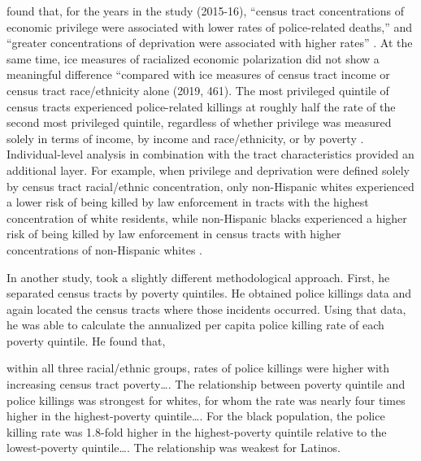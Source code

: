 \documentclass[12pt]{article}
\renewenvironment{quote}
  {\list{}{\leftmargin=\parindent\rightmargin=0pt}%
   \item\relax}
  {\endlist}
\begin{document}
\citeauthor{feldmanPoliceRelatedDeathsNeighborhood2019} found that, for the years in the study (2015-16), “census tract concentrations of economic privilege were associated with lower rates of police-related deaths,” and “greater concentrations of deprivation were associated with higher rates” \parencite*[461]{feldmanPoliceRelatedDeathsNeighborhood2019}. At the same time, \acrshort{ice} measures of racialized economic polarization did not show a meaningful difference “compared with \acrshort{ice} measures of census tract income or census tract race/ethnicity alone (2019, 461). The most privileged quintile of census tracts experienced police-related killings at roughly half the rate of the second most privileged quintile, regardless of whether privilege was measured solely in terms of income, by income and race/ethnicity, or by poverty \parencite*[461]{feldmanPoliceRelatedDeathsNeighborhood2019}. Individual-level analysis in combination with the tract characteristics provided an additional layer. For example, when privilege and deprivation were defined solely by census tract racial/ethnic concentration, only non-Hispanic whites experienced a lower risk of being killed by law enforcement in tracts with the highest concentration of white residents, while non-Hispanic blacks experienced a higher risk of being killed by law enforcement in census tracts with higher concentrations of non-Hispanic whites \parencite*[461]{feldmanPoliceRelatedDeathsNeighborhood2019}.

In another study, \textcite{feldmanPoliceKillingsUS2020} took a slightly different methodological approach. First, he separated census tracts by poverty quintiles. He obtained police killings data and again located the census tracts where those incidents occurred. Using that data, he was able to calculate the annualized per capita police killing rate of each poverty quintile. He found that,

\begin{quote}
within all three racial/ethnic groups, rates of police killings were higher with increasing census tract poverty…. The relationship between poverty quintile and police killings was strongest for whites, for whom the rate was nearly four times higher in the highest-poverty quintile…. For the black population, the police killing rate was 1.8-fold higher in the highest-poverty quintile relative to the lowest-poverty quintile…. The relationship was weakest for Latinos. \parencite{feldmanPoliceKillingsUS2020}
\end{quote}
\end{document}
